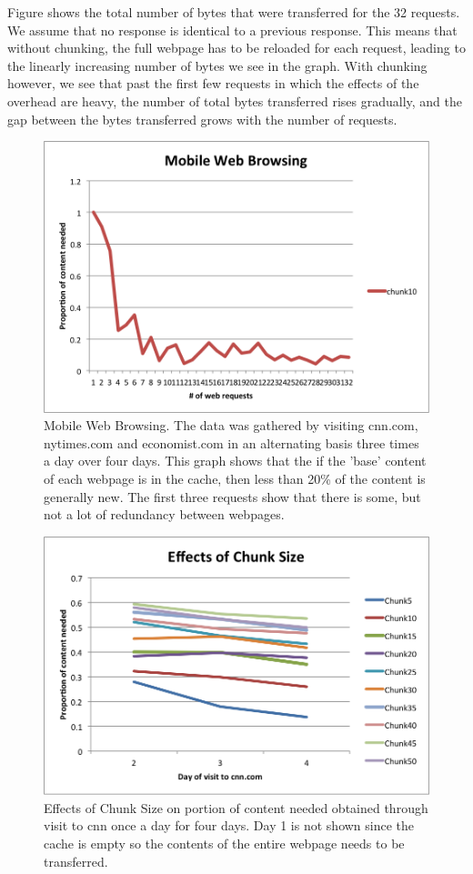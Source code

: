 Figure shows the total number of bytes that were transferred for the 32 requests. 
We assume that no response is identical to a previous response. 
This means that without chunking, the full webpage has to be reloaded for each request, leading to the linearly increasing number of bytes we see in the graph. 
With chunking however, we see that past the first few requests in which the effects of the overhead are heavy, the number of total bytes transferred rises gradually, and the gap between the bytes transferred grows with the number of requests.


\begin{figure}[h] 
\centering \includegraphics[scale=0.40]{images/browsing.png}
\caption{Mobile Web Browsing. The data was gathered by visiting cnn.com, nytimes.com and economist.com in an alternating basis three times a day over four days. This graph shows that the if the 'base' content of each webpage is in the cache, then less than 20\% of the content is generally new. The first three requests show that there is some, but not a lot of redundancy between webpages.}
\end{figure}

\begin{figure}[h] 
\centering \includegraphics[scale=0.40]{images/chunksize.png}
\caption{Effects of Chunk Size on portion of content needed obtained through visit to cnn once a day for four days. Day 1 is not shown since the cache is empty so the contents of the entire webpage needs to be transferred.}
\end{figure}


